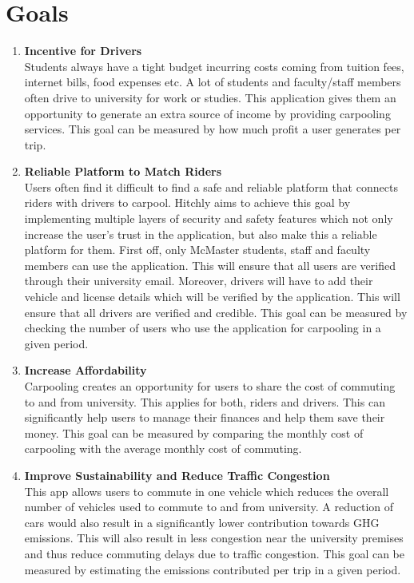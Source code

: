 \documentclass{article}
\begin{document}
\section{Goals}
\begin{enumerate}
\item \textbf{Incentive for Drivers}\\ 
Students always have a tight budget incurring costs coming from tuition fees, internet bills, food expenses etc. A lot of students and faculty/staff members often drive to university for work or studies. This application gives them an opportunity to generate an extra source of income by providing carpooling services. This goal can be measured by how much profit a user generates per trip.  

\item \textbf{Reliable Platform to Match Riders} \\
Users often find it difficult to find a safe and reliable platform that connects riders with drivers to carpool. Hitchly aims to achieve this goal by implementing multiple layers of security and safety features which not only increase the user's trust in the application, but also make this a reliable platform for them. First off, only McMaster students, staff and faculty members can use the application. This will ensure that all users are verified through their university email. Moreover, drivers will have to add their vehicle and license details which will be verified by the application. This will ensure that all drivers are verified and credible. This goal can be measured by checking the number of users who use the application for carpooling in a given period.

\item \textbf{Increase Affordability} \\
Carpooling creates an opportunity for users to share the cost of commuting to and from university. This applies for both, riders and drivers. This can significantly help users to manage their finances and help them save their money. This goal can be measured by comparing the monthly cost of carpooling with the average monthly cost of commuting.

\item \textbf{Improve Sustainability and Reduce Traffic Congestion} \\
This app allows users to commute in one vehicle which reduces the overall number of vehicles used to commute to and from university. A reduction of cars would also result in a significantly lower contribution towards GHG emissions. This will also result in less congestion near the university premises and thus reduce commuting delays due to traffic congestion.  This goal can be measured by estimating the emissions contributed per trip in a given period.  


\end{enumerate}
\end{document}
